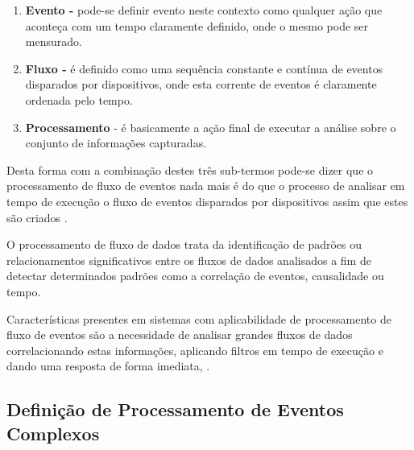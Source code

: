 \documentclass[ti,table]{texufpel} %
\begin{document}

\begin{enumerate} 

    \item  \textbf{Evento -} pode-se definir evento neste contexto como qualquer ação que aconteça com um tempo claramente definido, onde o mesmo pode ser mensurado.   

     

    \item  \textbf{Fluxo -} é definido como uma sequência constante e contínua de eventos disparados por dispositivos, onde esta corrente de eventos é claramente ordenada pelo tempo. 

     

    \item  \textbf{Processamento} - é basicamente a ação final de executar a análise sobre o conjunto de informações capturadas. 

\end{enumerate} 

Desta forma com a combinação destes três sub-termos pode-se dizer que o processamento de fluxo de eventos nada mais é do que o processo de analisar em tempo de execução o fluxo de eventos disparados por dispositivos assim que estes são criados \cite{dayarathna2018recent}.  

  

O processamento de fluxo de dados trata da identificação de padrões ou relacionamentos significativos entre os fluxos de dados analisados a fim de detectar determinados padrões como a correlação de eventos, causalidade ou tempo. 

Características presentes em sistemas com aplicabilidade de processamento de fluxo de eventos são a necessidade de analisar grandes fluxos de dados correlacionando estas informações, aplicando filtros em tempo de execução e dando uma resposta de forma imediata, \cite{appel2013event}. 

  

  


  

\subsection{Definição de Processamento de Eventos Complexos} 
\end{document}
